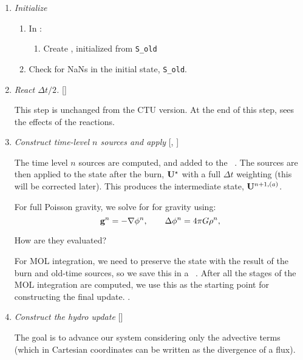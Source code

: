 \begin{enumerate}
\item \label{strang:init} {\em Initialize}

  \begin{enumerate}
  \item In  :
    \begin{enumerate}
    \item Create , initialized from {\tt S\_old}
    \end{enumerate}

  \item Check for NaNs in the initial state, {\tt S\_old}.
  \end{enumerate}

\item {\em React $\Delta t/2$.} []

  This step is unchanged from the CTU version.  At the end of this
  step,  sees the effects of the reactions.


\item \label{strang:oldsource} {\em Construct time-level $n$ sources and apply} 
  [, ]

  The time level $n$ sources are computed, and added to the
  \statedata\ .  The sources are then applied
  to the state after the burn, ${\bf U}^\star$ with a full $\Delta t$
  weighting (this will be corrected later).  This produces the
  intermediate state, ${\bf U}^{n+1,(a)}$.

  For full Poisson gravity, we solve for for gravity using:
  \begin{equation}
    {\bf g}^n = -\nabla\phi^n, \qquad
    \Delta\phi^n = 4\pi G\rho^n,
  \end{equation}

  How are they evaluated?

  For MOL integration, we need to preserve the state with the result
  of the burn and old-time sources, so we save this in a
  \multifab\ .  After all the stages of the MOL
  integration are computed, we use this as the starting point for 
  constructing the final update. .

\item \label{strang:hydro} {\em Construct the hydro update} []

  The goal is to advance our system considering only the advective
  terms (which in Cartesian coordinates can be written as the
  divergence of a flux).


\end{enumerate}
